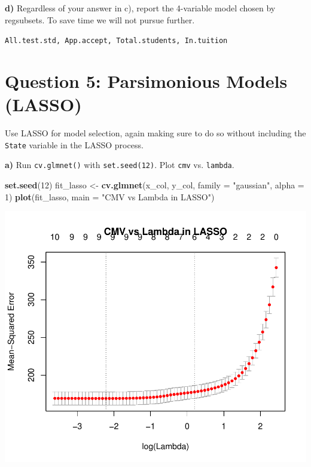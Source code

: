 \documentclass[]{article}
\newenvironment{Shaded}{\begin{snugshade}}{\end{snugshade}}
\newcommand{\KeywordTok}[1]{\textcolor[rgb]{0.13,0.29,0.53}{\textbf{#1}}}
\newcommand{\DataTypeTok}[1]{\textcolor[rgb]{0.13,0.29,0.53}{#1}}
\newcommand{\DecValTok}[1]{\textcolor[rgb]{0.00,0.00,0.81}{#1}}
\newcommand{\StringTok}[1]{\textcolor[rgb]{0.31,0.60,0.02}{#1}}
\newcommand{\NormalTok}[1]{#1}
\begin{document}
\textbf{d)} Regardless of your answer in c), report the 4-variable model
chosen by regsubsets. To save time we will not pursue further.

\texttt{All.test.std,\ App.accept,\ Total.students,\ In.tuition}

\section{Question 5: Parsimonious Models
(LASSO)}\label{question-5-parsimonious-models-lasso}

Use LASSO for model selection, again making sure to do so without
including the \texttt{State} variable in the LASSO process.

\textbf{a)} Run \texttt{cv.glmnet()} with \texttt{set.seed(12)}. Plot
\texttt{cmv} vs. \texttt{lambda}.

\begin{Shaded}
\begin{Highlighting}[]
\KeywordTok{set.seed}\NormalTok{(}\DecValTok{12}\NormalTok{)}
\NormalTok{fit_lasso <-}\StringTok{ }\KeywordTok{cv.glmnet}\NormalTok{(x_col, y_col, }\DataTypeTok{family =} \StringTok{"gaussian"}\NormalTok{, }\DataTypeTok{alpha =} \DecValTok{1}\NormalTok{)}
\KeywordTok{plot}\NormalTok{(fit_lasso, }\DataTypeTok{main =} \StringTok{"CMV vs Lambda in LASSO"}\NormalTok{)}
\end{Highlighting}
\end{Shaded}

\begin{flushleft}\includegraphics{Midterm_11_01_2016_Answers_files/figure-latex/unnamed-chunk-28-1} \end{flushleft}
\end{document}
